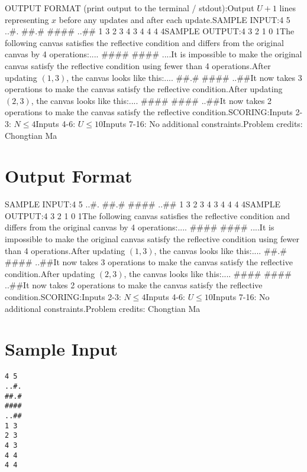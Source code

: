 \documentclass[12pt]{article}
\begin{document}
OUTPUT FORMAT (print output to the terminal / stdout):Output $U+1$ lines representing $x$ before any updates and after each update.SAMPLE INPUT:4 5
..#.
##.#
####
..##
1 3
2 3
4 3
4 4
4 4SAMPLE OUTPUT:4
3
2
1
0
1The following canvas satisfies the reflective condition and differs from the
original canvas by 4 operations:....
####
####
....It is impossible to make the original canvas satisfy the reflective condition
using fewer than 4 operations.After updating $(1, 3)$, the canvas looks like this:....
##.#
####
..##It now takes 3 operations to make the canvas satisfy the reflective condition.After updating $(2, 3)$, the canvas looks like this:....
####
####
..##It now takes 2 operations to make the canvas satisfy the reflective condition.SCORING:Inputs 2-3: $N \le 4$Inputs 4-6: $U \le 10$Inputs
7-16: No additional constraints.Problem credits: Chongtian Ma

\section*{Output Format}
SAMPLE INPUT:4 5
..#.
##.#
####
..##
1 3
2 3
4 3
4 4
4 4SAMPLE OUTPUT:4
3
2
1
0
1The following canvas satisfies the reflective condition and differs from the
original canvas by 4 operations:....
####
####
....It is impossible to make the original canvas satisfy the reflective condition
using fewer than 4 operations.After updating $(1, 3)$, the canvas looks like this:....
##.#
####
..##It now takes 3 operations to make the canvas satisfy the reflective condition.After updating $(2, 3)$, the canvas looks like this:....
####
####
..##It now takes 2 operations to make the canvas satisfy the reflective condition.SCORING:Inputs 2-3: $N \le 4$Inputs 4-6: $U \le 10$Inputs
7-16: No additional constraints.Problem credits: Chongtian Ma

\section*{Sample Input}
\begin{verbatim}
4 5
..#.
##.#
####
..##
1 3
2 3
4 3
4 4
4 4
\end{verbatim}
\end{document}
